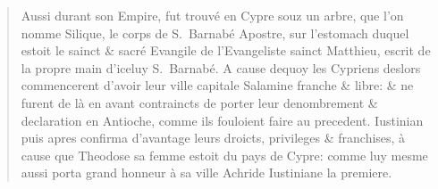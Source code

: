 
\begin{quotation}
Aussi durant son Empire, fut trouvé en Cypre souz un arbre, que l'on nomme Silique, le corps de S.~Barnabé Apostre, sur l'estomach duquel estoit le sainct \& sacré Evangile de l'Evangeliste sainct Matthieu, escrit de la propre main d'iceluy S.~Barnabé. A cause dequoy les Cypriens deslors commencerent d'avoir leur ville capitale Salamine franche \& libre: \& ne furent de là en avant contraincts de porter leur denombrement \& declaration en Antioche, comme ils fouloient faire au precedent. Iustinian puis apres confirma d'avantage leurs droicts, privileges \& franchises, à cause que Theodose sa femme estoit du pays de Cypre: comme luy mesme aussi porta grand honneur à sa ville Achride Iustiniane la premiere.
\end{quotation}